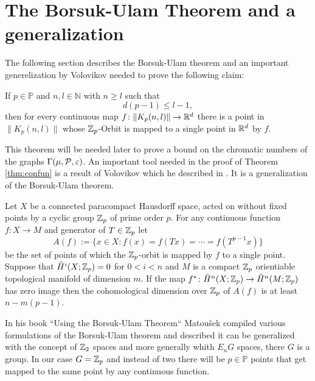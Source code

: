 \section{The Borsuk-Ulam Theorem and a generalization}\label{sec:borsuk}

The following section describes the Borsuk-Ulam theorem and an important generelization by Volovikov needed to prove the following claim:
\begin{thm}\label{thm:confun}
  If $p \in \mathbb{P}$ and $n, l \in \mathbb{N}$ with $n \geq l$ such that
  \begin{equation*}
    d(p-1) \leq l-1,
  \end{equation*}
  then for every continuous map $f\colon\lVert K_p(n,l)\rVert \to \R^d$ there is a point in $\lVert K_p(n,l)\rVert$ whose $\Z_p$-Orbit is mapped to a single point in $\R^d$ by $f$.
\end{thm}
This theorem will be needed later to prove a bound on the chromatic numbers of the graphs $\Gamma(\mu, \P, \varepsilon)$.
An important tool needed in the proof of Theorem \ref{thm:confun} is a result of Volovikov which he described in \cite{vol1980}. It is a generalization of the Borsuk-Ulam theorem.
\begin{lemma}\label{lem:vol}
  Let $X$ be a connected paracompact Hausdorff space, acted on without fixed points by a cyclic group $\Z_p$ of prime order $p$. For any continuous function $f\colon X \to M$ and generator of $T \in \Z_p$ let
  \begin{equation*}
    A(f) := \{x\in X\colon f(x) = f(Tx) = \cdots = f(T^{p-1}x)\}
  \end{equation*}
  be the set of points of which the $\Z_p$-orbit is mapped by $f$ to a single point. Suppose that $\tilde{H}^i(X; \Z_p) = 0$ for $0 < i < n$ and $M$ is a compact $\Z_p$ orientiable topological manifold of dimension $m$. If the map $f^*\colon \tilde{H}^n(X; \Z_p) \to \tilde{H}^n(M; \Z_p)$ has zero image then the cohomological dimension over $\Z_p$ of $A(f)$ is at least $n-m(p-1)$. 
\end{lemma}

In his book ``Using the Borsuk-Ulam Theorem`` \cite{using2003} Matoušek compiled various formulations of the Borsuk-Ulam theorem and described it can be generalized with the concept of $\Z_2$ spaces and more generally whith $E_nG$ spaces, there $G$ is a group. In our case $G = \Z_p$ and instead of two there will be $p \in \mathbb{P}$ points that get mapped to the same point by any continuous function. 

